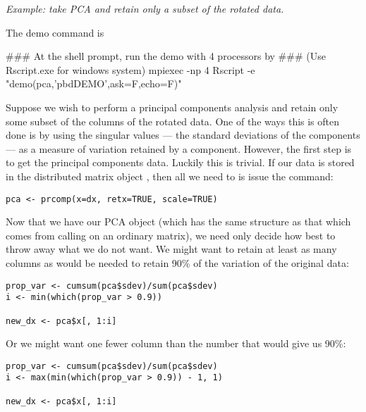 \emph{Example:  take PCA and retain only a subset of the rotated data.}

The demo command is
\begin{Command}
### At the shell prompt, run the demo with 4 processors by
### (Use Rscript.exe for windows system)
mpiexec -np 4 Rscript -e "demo(pca,'pbdDEMO',ask=F,echo=F)"
\end{Command}

Suppose we wish to perform a principal components analysis and retain only some subset of the columns of the rotated data.  One of the ways this is often done is by using the singular values --- the standard deviations of the components --- as a measure of variation retained by a component.  However, the first step is to get the principal components data.  Luckily this is trivial.  If our data is stored in the distributed matrix object , then all we need to is issue the command:
\begin{lstlisting}[language=rr]
pca <- prcomp(x=dx, retx=TRUE, scale=TRUE)
\end{lstlisting}

Now that we have our PCA object (which has the same structure as that which comes from calling  on an ordinary  matrix), we need only decide how best to throw away what we do not want.  We might want to retain at least as many columns as would be needed to retain 90\% of the variation of the original data:

\begin{lstlisting}[language=rr]
prop_var <- cumsum(pca$sdev)/sum(pca$sdev)
i <- min(which(prop_var > 0.9))

new_dx <- pca$x[, 1:i]
\end{lstlisting}

Or we might want one fewer column than the number that would give us 90\%:

\begin{lstlisting}[language=rr]
prop_var <- cumsum(pca$sdev)/sum(pca$sdev)
i <- max(min(which(prop_var > 0.9)) - 1, 1)

new_dx <- pca$x[, 1:i]
\end{lstlisting}

